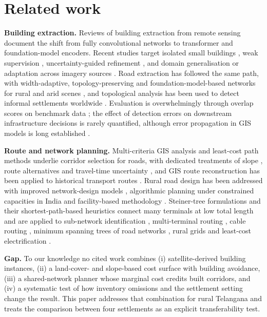 \documentclass[12pt,a4paper]{article}
\begin{document}
\section{Related work}
\textbf{Building extraction.} Reviews of building extraction from remote sensing \cite{r01} document the shift from fully convolutional networks \cite{ji2019whu} to transformer and foundation-model encoders. Recent studies target isolated small buildings \cite{r63}, weak supervision \cite{r62}, uncertainty-guided refinement \cite{r64,r65}, and domain generalisation or adaptation across imagery sources \cite{r02,r66,r67,r68,r69,r70}. Road extraction has followed the same path, with width-adaptive, topology-preserving and foundation-model-based networks for rural and arid scenes \cite{r56,r57,r58,r59,r60}, and topological analysis has been used to detect informal settlements worldwide \cite{r48}. Evaluation is overwhelmingly through overlap scores on benchmark data \cite{foody2002status}; the effect of detection errors on downstream infrastructure decisions is rarely quantified, although error propagation in GIS models is long established \cite{heuvelink1998error}.

\textbf{Route and network planning.} Multi-criteria GIS analysis \cite{r06} and least-cost path methods \cite{collischonn2000lcp,r53,r54} underlie corridor selection for roads, with dedicated treatments of slope \cite{r54}, route alternatives \cite{r53} and travel-time uncertainty \cite{r61}, and GIS route reconstruction has been applied to historical transport routes \cite{r55}. Rural road design has been addressed with improved network-design models \cite{r41}, algorithmic planning under constrained capacities in India \cite{r43} and facility-based methodology \cite{r44}. Steiner-tree formulations \cite{hwang1992steiner} and their shortest-path-based heuristics \cite{kou1981steiner,mehlhorn1988steiner} connect many terminals at low total length and are applied to sub-network identification \cite{r51}, multi-terminal routing \cite{r52}, cable routing \cite{r45}, minimum spanning trees of road networks \cite{r46}, rural grids \cite{r47} and least-cost electrification \cite{r50}.

\textbf{Gap.} To our knowledge no cited work combines (i) satellite-derived building instances, (ii) a land-cover- and slope-based cost surface with building avoidance, (iii) a shared-network planner whose marginal cost credits built corridors, and (iv) a systematic test of how inventory omissions and the settlement setting change the result. This paper addresses that combination for rural Telangana and treats the comparison between four settlements as an explicit transferability test.
\end{document}
